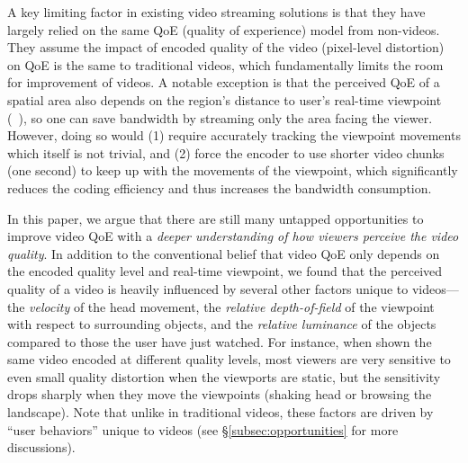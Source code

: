 A key limiting factor in existing \vr video streaming solutions is that they have largely relied on the same QoE (quality of experience) model from non-\vr videos. 
They assume the impact of encoded quality of the video (\eg pixel-level distortion) on QoE is the same to traditional videos, which fundamentally limits the room for improvement of \vr videos.
A notable exception is that the perceived QoE of a spatial area also depends on the region's distance to user's real-time viewpoint (\eg~\cite{??,??,??,??}), so one can save bandwidth by streaming only the area facing the viewer.
However, doing so would (1) require accurately tracking the viewpoint movements which itself is not trivial, and (2) force the encoder to use shorter video chunks (\eg one second) to keep up with the movements of the viewpoint, which significantly reduces the coding efficiency and thus increases the bandwidth consumption.

In this paper, we argue that there are still many untapped opportunities to improve \vr video QoE with a {\em deeper understanding of how viewers perceive the \vr video quality}.
In addition to the conventional belief that \vr video QoE only depends on the encoded quality level and real-time viewpoint, 
we found that the perceived quality of a \vr video is heavily influenced by several other factors unique to \vr videos---the {\em velocity} of the head movement, the {\em relative depth-of-field} of the viewpoint with respect to surrounding objects, and the {\em relative luminance} of the objects compared to those the user have just watched. 
For instance, when shown the same video encoded at different quality levels, most viewers are very sensitive to even small quality distortion when the viewports are static, but the sensitivity drops sharply when they move the viewpoints (\eg shaking head or browsing the landscape). 
Note that unlike in traditional videos, these factors are driven by ``user behaviors'' unique to \vr videos (see \S\ref{subsec:opportunities} for more discussions).


